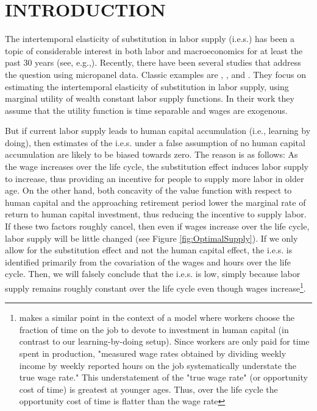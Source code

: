 \documentclass[\econtexRoot/ImaiKeane]{subfiles}
\begin{document}
\section{INTRODUCTION}
\label{section:intro}
\quad The intertemporal elasticity of substitution in labor supply (i.e.s.) has been a topic of considerable interest in both labor and macroeconomics for at least the past 30 years (see, e.g.,\cite{Lucas1969-ti}). Recently, there have been several studies that address the question using micropanel data. Classic examples are \cite{MaCurdy1981-iy}, \cite{Browning1985-ox}, and \cite{Altonji1986-zf}. They focus on estimating the intertemporal elasticity of substitution in labor supply, using marginal utility of wealth constant labor supply functions. In their work they assume that the utility function is time separable and wages are exogenous.\par
But if current labor supply leads to human capital accumulation (i.e., learning by doing), then estimates of the i.e.s. under a false assumption of no human capital accumulation are likely to be biased towards zero. The reason is as follows: As the wage increases over the life cycle, the substitution effect induces labor supply to increase, thus providing an incentive for people to supply more labor in older age. On the other hand, both concavity of the value function with respect to human capital and the approaching retirement period lower the marginal rate of return to human capital investment, thus reducing the incentive to supply labor. If these two factors roughly cancel, then even if wages increase over the life cycle, labor supply will be little changed (see Figure \ref{fig:OptimalSupply}). If we only allow for the substitution effect and not the human capital effect, the i.e.s. is identified primarily from the covariation of the wages and hours over the life cycle. Then, we will falsely conclude that the i.e.s. is low, simply because labor supply remains roughly constant over the life cycle even though wages increase\footnote[2]{ \cite{Heckman1976-lc} makes a similar point in the context of a model where workers choose the fraction of time on the job to devote to investment in human capital (in contrast to our learning-by-doing setup). Since workers are only paid for time spent in production, "measured wage rates obtained by dividing weekly income by weekly reported hours on the job systematically understate the true wage rate." This understatement of the "true wage rate" (or opportunity cost of time) is greatest at younger ages. Thus, over the life cycle the opportunity cost of time is flatter than the wage rate}. \par
\end{document}

